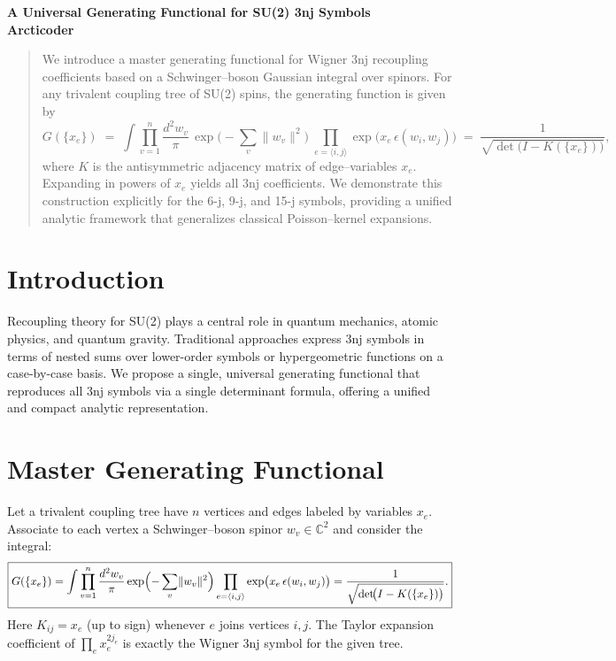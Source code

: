 \documentclass[11pt]{article}
\author{Arcticoder}
\date{July 25, 2025}
\begin{document}
\begin{center}
  {\LARGE \textbf{A Universal Generating Functional for SU(2) 3nj Symbols}}\\[1em]
  \textbf{Arcticoder}
\end{center}

\begin{abstract}
We introduce a master generating functional for Wigner 3nj recoupling coefficients based on
a Schwinger--boson Gaussian integral over spinors. For any trivalent coupling tree of SU(2) spins,
the generating function is given by
\[
  G(\{x_e\})
  \;=\;\int \prod_{v=1}^n \frac{d^2w_v}{\pi} \,\exp\bigl(-\sum_{v}\lVert w_v\rVert^2\bigr)
  \;\prod_{e=\langle i,j\rangle}\exp\bigl(x_e\,\epsilon(w_i,w_j)\bigr)
  \;=\;\frac{1}{\sqrt{\det\!\bigl(I - K(\{x_e\})\bigr)}},
\]
where $K$ is the antisymmetric adjacency matrix of edge--variables $x_e$. Expanding in powers of $x_e$
yields all 3nj coefficients. We demonstrate this construction explicitly for the 6-j, 9-j, and 15-j
symbols, providing a unified analytic framework that generalizes classical Poisson--kernel expansions.
\end{abstract}

\section{Introduction}
Recoupling theory for SU(2) plays a central role in quantum mechanics, atomic physics, and quantum
gravity. Traditional approaches express 3nj symbols in terms of nested sums over lower-order symbols
or hypergeometric functions on a case-by-case basis. We propose a single, universal generating functional
that reproduces all 3nj symbols via a single determinant formula, offering a unified and compact analytic representation.

\section{Master Generating Functional}
Let a trivalent coupling tree have $n$ vertices and edges labeled by variables $x_e$.
Associate to each vertex a Schwinger--boson spinor $w_v\in\mathbb{C}^2$ and consider the integral:
\begin{equation}\label{eq:master}
  \boxed{
  G(\{x_e\})
  = \int \prod_{v=1}^n \frac{d^2w_v}{\pi} 
    \exp\Bigl(-\sum_{v}\lVert w_v\rVert^2\Bigr)
    \prod_{e=\langle i,j\rangle}\exp\bigl(x_e\,\epsilon(w_i,w_j)\bigr)
  = \frac{1}{\sqrt{\det\!\bigl(I - K(\{x_e\})\bigr)}}.
  }
\end{equation}
Here $K_{ij}=x_e$ (up to sign) whenever $e$ joins vertices $i,j$. The Taylor expansion coefficient
of $\prod_e x_e^{2j_e}$ is exactly the Wigner 3nj symbol for the given tree.
\end{document}
